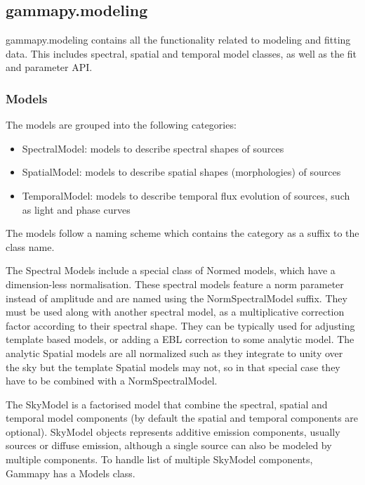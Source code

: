 \subsection{gammapy.modeling}
\label{ssec:gammapy-modeling}

gammapy.modeling contains all the functionality related to modeling and fitting
data. This includes spectral, spatial and temporal model classes, as well as
the fit and parameter API.

\subsubsection{Models}
\label{sssec:models}

The models are grouped into the following categories:

\begin{itemize}
	\item SpectralModel: models to describe spectral shapes of sources
	\item SpatialModel: models to describe spatial shapes (morphologies) of sources
	\item TemporalModel: models to describe temporal flux evolution of sources, such as
	      light and phase curves

\end{itemize}

The models follow a naming scheme which contains the category as a suffix to
the class name.

The  Spectral Models include a special class of Normed models, which have a
dimension-less normalisation. These spectral models feature a norm parameter
instead of amplitude and are named using the NormSpectralModel suffix. They
must be used along with another spectral model, as a multiplicative correction
factor according to their spectral shape. They can be typically used for
adjusting template based models, or adding a EBL correction to some analytic
model. The analytic Spatial models are all normalized such as they integrate to
unity over the sky but the template Spatial models may not, so in that special
case they have to be combined with a NormSpectralModel.

The SkyModel is a factorised model that combine the spectral, spatial and
temporal model components (by default the spatial and temporal components are
optional). SkyModel objects represents additive emission components, usually
sources or diffuse emission, although a single source can also be modeled by
multiple components. To handle list of multiple SkyModel components, Gammapy
has a Models class.

